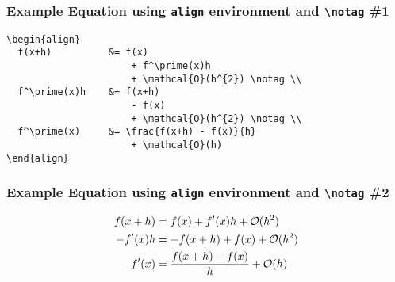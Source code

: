 \documentclass{beamer}
\begin{document}
\begin{frame}[fragile]
  \frametitle{Example Equation using \texttt{align} environment and \texttt{\textbackslash notag} \#1}

  \begin{verbatim}
\begin{align}
  f(x+h)          &= f(x)
                      + f^\prime(x)h
                      + \mathcal{O}(h^{2}) \notag \\
  f^\prime(x)h    &= f(x+h)
                      - f(x)
                      + \mathcal{O}(h^{2}) \notag \\
  f^\prime(x)     &= \frac{f(x+h) - f(x)}{h}
                      + \mathcal{O}(h)
\end{align}
  \end{verbatim}
\end{frame}

\begin{frame}[fragile]
  \frametitle{Example Equation using \texttt{align} environment and \texttt{\textbackslash notag} \#2}

\begin{align}
  f(x+h)          &= f(x)
                      + f^\prime(x)h
                      + \mathcal{O}(h^{2}) \notag \\
  -f^\prime(x)h    &= -f(x+h)
                      + f(x)
                      + \mathcal{O}(h^{2}) \notag \\
  f^\prime(x)     &= \frac{f(x+h) - f(x)}{h}
                      + \mathcal{O}(h)
  \end{align}
\end{frame}
\end{document}
